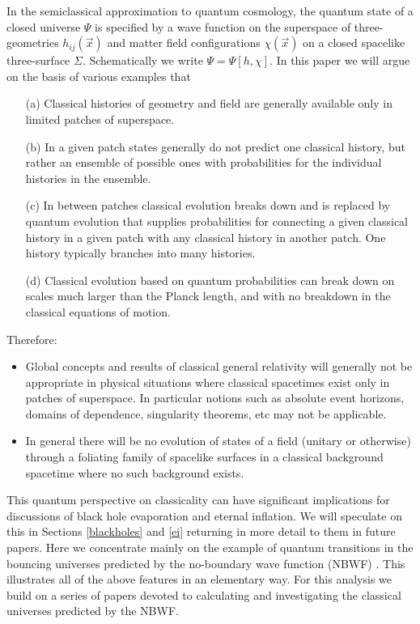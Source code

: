 \documentclass[prd,floats,superscriptaddress,eqsecnum,floatfix,nofootinbib,12pt]{revtex4}
\def\vx{{\vec x}}
\def\vx{{\vec x}}
\def\zf{}
\def\jf{}
\def\j2{}
\begin{document}
{ In the semiclassical approximation to quantum cosmology}, the quantum state of a closed universe $\Psi$  is specified by a wave function on the superspace of three-geometries $h_{ij}(\vx)$  and matter field configurations $\chi(\vx)$ on a closed spacelike three-surface $\Sigma$. Schematically we write $\Psi=\Psi[h,\chi]$.  In this paper we will argue on the basis of various examples that
\begin{enumerate}
 
\item[(a)] Classical histories of geometry and field are generally available only in limited patches of superspace. 
 
 \item[(b)] In a given patch states generally do not predict one classical history, but rather an ensemble of possible ones with probabilities for the individual histories in the ensemble.   
 
 \item [(c)] In between patches classical {evolution} breaks down and is replaced by quantum evolution that supplies probabilities for connecting a given classical history in a given patch with any {\j2 classical} history in another patch. One history {\jf typically} branches into many histories. 
 
 \item[(d)] Classical {\zf evolution} based on quantum probabilities can break down on scales {\jf much larger  than} the Planck length, and with no breakdown in the classical equations of motion. 
 
 \end{enumerate}
\noindent Therefore:
 \begin{itemize}  
 
 \item  Global concepts and results of classical general relativity will generally not be appropriate in physical situations where classical spacetimes exist only in patches of superspace. In particular notions such as absolute event horizons, domains of dependence, singularity theorems, etc may not be applicable. 
 
 \item  In general there will be no evolution of states of a field (unitary or otherwise) through a foliating family of spacelike surfaces in a classical background spacetime where no such background exists. 

 \end{itemize}   
 
{\jf This quantum perspective on classicality can have significant implications} for discussions of black hole evaporation{\j2 and eternal inflation}. We will speculate on this in Sections \ref{blackholes} and \ref{ei} returning in more detail to them in  future papers. Here we concentrate mainly on the example of quantum transitions in the bouncing universes predicted by the no-boundary wave function (NBWF) \cite{NBWF}. This illustrates all of the above features in an elementary way. For this analysis we build on a series of papers \cite{HHH08a,HHH08b,HHH10a,HHH10b,HH13} devoted to calculating and investigating the classical universes predicted by the NBWF. 
\end{document}
